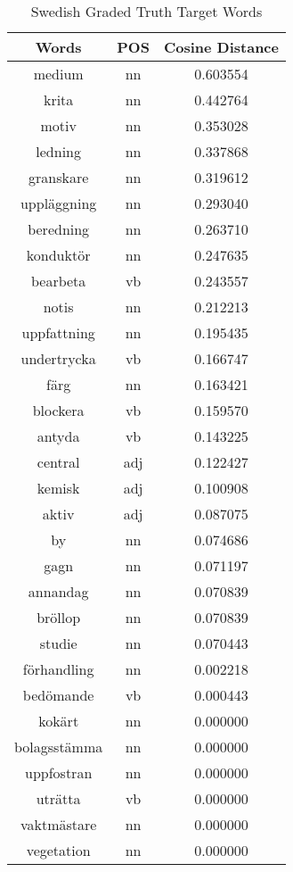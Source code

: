 \begin{table}[h]
\centering
\begin{tabular}{ccc} 
\toprule
Words        & POS & Cosine Distance  \\ 
\midrule
medium       & nn  & 0.603554         \\
krita        & nn  & 0.442764         \\
motiv        & nn  & 0.353028         \\
ledning      & nn  & 0.337868         \\
granskare    & nn  & 0.319612         \\
uppläggning  & nn  & 0.293040         \\
beredning    & nn  & 0.263710         \\
konduktör    & nn  & 0.247635         \\
bearbeta     & vb  & 0.243557         \\
notis        & nn  & 0.212213         \\
uppfattning  & nn  & 0.195435         \\
undertrycka  & vb  & 0.166747         \\
färg         & nn  & 0.163421         \\
blockera     & vb  & 0.159570         \\
antyda       & vb  & 0.143225         \\
central      & adj & 0.122427         \\
kemisk       & adj & 0.100908         \\
aktiv        & adj & 0.087075         \\
by           & nn  & 0.074686         \\
gagn         & nn  & 0.071197         \\
annandag     & nn  & 0.070839         \\
bröllop      & nn  & 0.070839         \\
studie       & nn  & 0.070443         \\
förhandling  & nn  & 0.002218         \\
bedömande    & vb  & 0.000443         \\
kokärt       & nn  & 0.000000         \\
bolagsstämma & nn  & 0.000000         \\
uppfostran   & nn  & 0.000000         \\
uträtta      & vb  & 0.000000         \\
vaktmästare  & nn  & 0.000000         \\
vegetation   & nn  & 0.000000         \\
\bottomrule
\end{tabular}
\caption{Swedish Graded Truth Target Words}
\label{tab:sve-truthtargets}
\end{table}

